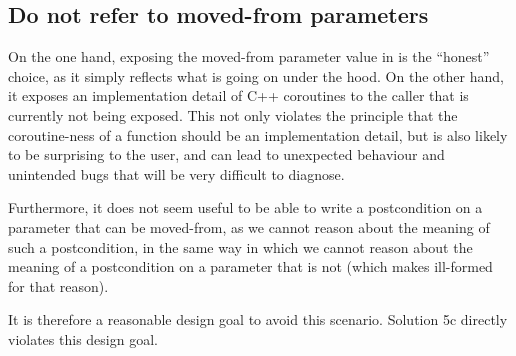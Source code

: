 \subsection{Do not refer to moved-from  parameters}

On the one hand, exposing the moved-from parameter value in  is the ``honest'' choice, as it simply reflects what is going on under the hood. On the other hand, it exposes an implementation detail of C++ coroutines to the caller that is currently not being exposed. This not only violates the principle that the coroutine-ness of a function should be an implementation detail, but is also likely to be surprising to the user, and can lead to unexpected behaviour and unintended bugs that will be very difficult to diagnose.

Furthermore, it does not seem useful to be able to write a postcondition on a parameter that can be moved-from, as we cannot reason about the meaning of such a postcondition, in the same way in which we cannot reason about the meaning of a postcondition on a parameter that is not  (which \cite{P2900R8} makes ill-formed for that reason).

It is therefore a reasonable design goal to avoid this scenario. Solution 5c directly violates this design goal.


